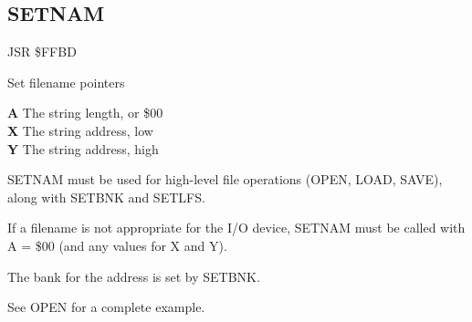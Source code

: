 \subsection{SETNAM}
\label{KERNAL Jump Table!SETNAM}
\begin{description}[leftmargin=2cm,style=nextline]
    \item [Address:] JSR \$FFBD
    \item [Description:] Set filename pointers
    \item [Inputs:]
        \textbf{A} The string length, or \$00 \\
        \textbf{X} The string address, low \\
        \textbf{Y} The string address, high
    \item [Remarks:]
        SETNAM must be used for high-level file operations (OPEN, LOAD, SAVE), along with SETBNK and SETLFS.

        If a filename is not appropriate for the I/O device, SETNAM must be called with A = \$00 (and any values for X and Y).

        The bank for the address is set by SETBNK.

        See OPEN for a complete example.
    \item [Example:]
\end{description}



\newpage
